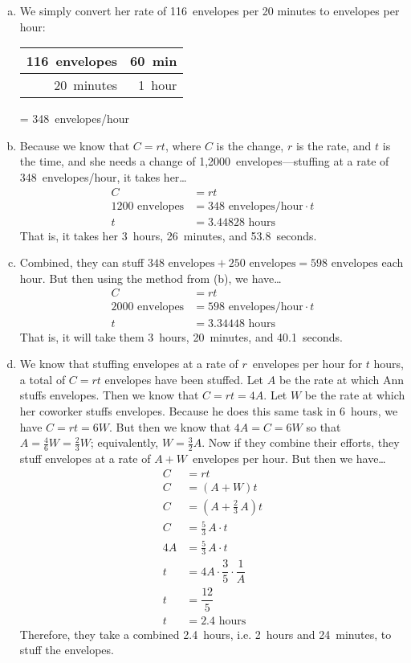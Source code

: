 \documentclass[11pt,letterpaper]{article}
\begin{document}
\sol
\begin{enumerate}[(a)]
\item We simply convert her rate of 116~envelopes per 20 minutes to envelopes per hour: \par
	\begin{table}[!ht]
	\centering
	\begin{tabular}{r|r}
	116~envelopes & 60~min \\ \hline
	20~minutes	& 1~hour
	\end{tabular}
	= 348~envelopes/hour
	\end{table} \pspace

\item Because we know that $C= rt$, where $C$ is the change, $r$ is the rate, and $t$ is the time, and she needs a change of 1,2000~envelopes---stuffing at a rate of 348~envelopes/hour, it takes her\dots
	\[
	\begin{aligned}
	C&= rt \\[0.3cm]
	1200 \text{ envelopes}&= 348 \text{ envelopes/hour} \cdot t \\[0.3cm]
	t&=  3.44828 \text{ hours}
	\end{aligned}
	\]
That is, it takes her 3~hours, 26~minutes, and 53.8~seconds. \pspace

\item Combined, they can stuff $348 \text{ envelopes} + 250 \text{ envelopes}= 598 \text{ envelopes}$ each hour. But then using the method from (b), we have\dots
	\[
	\begin{aligned}
	C&= rt \\[0.3cm]
	2000 \text{ envelopes}&= 598 \text{ envelopes/hour} \cdot t \\[0.3cm]
	t&=  3.34448 \text{ hours}
	\end{aligned}
	\]
That is, it will take them 3~hours, 20~minutes, and 40.1~seconds. \pspace

\item We know that stuffing envelopes at a rate of $r$~envelopes per hour for $t$ hours, a total of $C= rt$ envelopes have been stuffed. Let $A$ be the rate at which Ann stuffs envelopes. Then we know that $C= rt= 4A$. Let $W$ be the rate at which her coworker stuffs envelopes. Because he does this same task in 6~hours, we have $C= rt= 6W$. But then we know that $4A= C= 6W$ so that $A= \frac{4}{6}W= \frac{2}{3} W$; equivalently, $W= \frac{3}{2}A$. Now if they combine their efforts, they stuff envelopes at a rate of $A + W$~envelopes per hour. But then we have\dots
	\[
	\begin{aligned}
	C&= rt \\[0.3cm]
	C&= (A + W)t \\[0.3cm]
	C&= \left(A + \frac{2}{3}\, A \right) t \\[0.3cm]
	C&= \frac{5}{3}\, A \cdot t \\[0.3cm]
	4A&= \frac{5}{3}\,A \cdot t \\[0.3cm]
	t&= 4A \cdot \dfrac{3}{5} \cdot \dfrac{1}{A} \\[0.3cm]
	t&= \dfrac{12}{5} \\[0.3cm]
	t&= 2.4 \text{ hours}
	\end{aligned}
	\]
Therefore, they take a combined 2.4~hours, i.e. 2~hours and 24~minutes, to stuff the envelopes. 
\end{enumerate}
\end{document}
